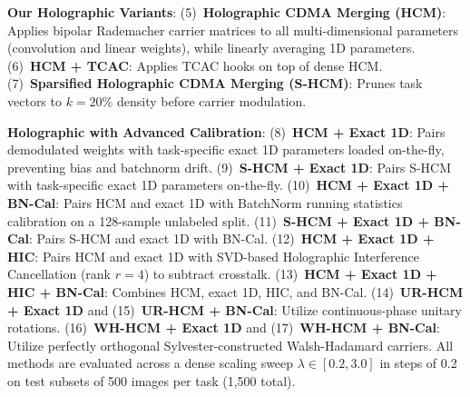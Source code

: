 \documentclass{article}
\begin{document}
\textbf{Our Holographic Variants}: (5)~\textbf{Holographic CDMA Merging (HCM)}: Applies bipolar Rademacher carrier matrices to all multi-dimensional parameters (convolution and linear weights), while linearly averaging 1D parameters. (6)~\textbf{HCM + TCAC}: Applies TCAC hooks on top of dense HCM. (7)~\textbf{Sparsified Holographic CDMA Merging (S-HCM)}: Prunes task vectors to $k=20\%$ density before carrier modulation.

\textbf{Holographic with Advanced Calibration}: (8)~\textbf{HCM + Exact 1D}: Pairs demodulated weights with task-specific exact 1D parameters loaded on-the-fly, preventing bias and batchnorm drift. (9)~\textbf{S-HCM + Exact 1D}: Pairs S-HCM with task-specific exact 1D parameters on-the-fly. (10)~\textbf{HCM + Exact 1D + BN-Cal}: Pairs HCM and exact 1D with BatchNorm running statistics calibration on a 128-sample unlabeled split. (11)~\textbf{S-HCM + Exact 1D + BN-Cal}: Pairs S-HCM and exact 1D with BN-Cal. (12)~\textbf{HCM + Exact 1D + HIC}: Pairs HCM and exact 1D with SVD-based Holographic Interference Cancellation (rank $r=4$) to subtract crosstalk. (13)~\textbf{HCM + Exact 1D + HIC + BN-Cal}: Combines HCM, exact 1D, HIC, and BN-Cal. (14)~\textbf{UR-HCM + Exact 1D} and (15)~\textbf{UR-HCM + BN-Cal}: Utilize continuous-phase unitary rotations. (16)~\textbf{WH-HCM + Exact 1D} and (17)~\textbf{WH-HCM + BN-Cal}: Utilize perfectly orthogonal Sylvester-constructed Walsh-Hadamard carriers.
All methods are evaluated across a dense scaling sweep $\lambda \in [0.2, 3.0]$ in steps of 0.2 on test subsets of 500 images per task (1,500 total).
\end{document}

